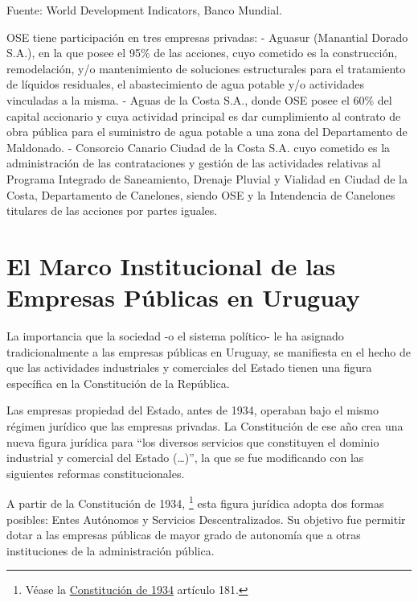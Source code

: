 \documentclass[
  12pt,
  spanish,
]{book}
\begin{document}
Fuente: World Development Indicators, Banco Mundial.

OSE tiene participación en tres empresas privadas:
- Aguasur (Manantial Dorado S.A.), en la que posee el 95\% de las acciones, cuyo cometido es la construcción, remodelación, y/o mantenimiento de soluciones estructurales para el tratamiento de líquidos residuales, el abastecimiento de agua potable y/o actividades vinculadas a la misma.
- Aguas de la Costa S.A., donde OSE posee el 60\% del capital accionario y cuya actividad principal es dar cumplimiento al contrato de obra pública para el suministro de agua potable a una zona del Departamento de Maldonado.
- Consorcio Canario Ciudad de la Costa S.A. cuyo cometido es la administración de las contrataciones y gestión de las actividades relativas al Programa Integrado de Saneamiento, Drenaje Pluvial y Vialidad en Ciudad de la Costa, Departamento de Canelones, siendo OSE y la Intendencia de Canelones titulares de las acciones por partes iguales.

\hypertarget{el-marco-institucional-de-las-empresas-puxfablicas-en-uruguay}{%
\section{El Marco Institucional de las Empresas Públicas en Uruguay}\label{el-marco-institucional-de-las-empresas-puxfablicas-en-uruguay}}

La importancia que la sociedad -o el sistema político- le ha asignado tradicionalmente a las empresas públicas en Uruguay, se manifiesta en el hecho de que las actividades industriales y comerciales del Estado tienen una figura específica en la Constitución de la República.

Las empresas propiedad del Estado, antes de 1934, operaban bajo el mismo régimen jurídico que las empresas privadas. La Constitución de ese año crea una nueva figura jurídica para ``los diversos servicios que constituyen el dominio industrial y comercial del Estado (\ldots)'', la que se fue modificando con las siguientes reformas constitucionales.

A partir de la Constitución de 1934,
\footnote{Véase la \href{https://legislativo.parlamento.gub.uy/temporales/2680947.HTML}{Constitución de 1934} artículo 181.}
esta figura jurídica adopta dos formas posibles: Entes Autónomos y Servicios Descentralizados. Su objetivo fue permitir dotar a las empresas públicas de mayor grado de autonomía que a otras instituciones de la administración pública.
\end{document}
